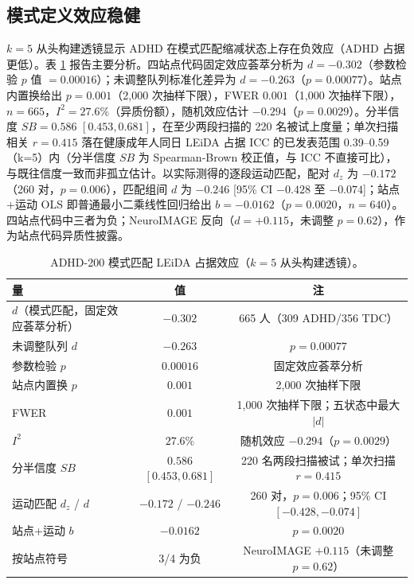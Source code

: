 \documentclass[11pt]{ctexart}
\theoremstyle{definition}
\begin{document}
\subsection{模式定义效应稳健}
$k=5$ 从头构建透镜显示 ADHD 在模式匹配缩减状态上存在负效应（ADHD 占据更低）。表 \ref{tab:o2} 报告主要分析。四站点代码固定效应荟萃分析为 $d=-0.302$（参数检验 $p$ 值 $=0.00016$）；未调整队列标准化差异为 $d=-0.263$（$p=0.00077$）。站点内置换给出 $p=0.001$（2,000 次抽样下限），FWER $0.001$（1,000 次抽样下限），$n=665$，$I^2=27.6\%$（异质份额），随机效应估计 $-0.294$（$p=0.0029$）。分半信度 $SB=0.586$ $[0.453,0.681]$，在至少两段扫描的 220 名被试上度量；单次扫描相关 $r=0.415$ 落在健康成年人同日 LEiDA 占据 ICC 的已发表范围 0.39--0.59（k=5）内\cite{Vohryzek2020}（分半信度 $SB$ 为 Spearman-Brown 校正值，与 ICC 不直接可比），与既往信度一致而非孤立估计。以实际测得的逐段运动匹配，配对 $d_z$ 为 $-0.172$（260 对，$p=0.006$），匹配组间 $d$ 为 $-0.246$ [95\% CI $-0.428$ 至 $-0.074$]；站点+运动 OLS 即普通最小二乘线性回归给出 $b=-0.0162$（$p=0.0020$，$n=640$）。四站点代码中三者为负；NeuroIMAGE 反向（$d=+0.115$，未调整 $p=0.62$），作为站点代码异质性披露。

\begin{table}[H]
\centering
\caption{ADHD-200 模式匹配 LEiDA 占据效应（$k=5$ 从头构建透镜）。}
\begin{tabular}{lcc}
\toprule
量 & 值 & 注 \\
\midrule
$d$（模式匹配，固定效应荟萃分析） & $-0.302$ & 665 人（309 ADHD/356 TDC） \\
未调整队列 $d$ & $-0.263$ & $p=0.00077$ \\
参数检验 $p$ & $0.00016$ & 固定效应荟萃分析 \\
站点内置换 $p$ & $0.001$ & 2,000 次抽样下限 \\
FWER & $0.001$ & 1,000 次抽样下限；五状态中最大 $|d|$ \\
$I^2$ & $27.6\%$ & 随机效应 $-0.294$（$p=0.0029$） \\
分半信度 $SB$ & $0.586$ $[0.453,0.681]$ & 220 名两段扫描被试；单次扫描 $r=0.415$ \\
运动匹配 $d_z$ / $d$ & $-0.172$ / $-0.246$ & 260 对，$p=0.006$；95\% CI $[-0.428,-0.074]$ \\
站点+运动 $b$ & $-0.0162$ & $p=0.0020$ \\
按站点符号 & 3/4 为负 & NeuroIMAGE $+0.115$（未调整 $p=0.62$） \\
\bottomrule
\end{tabular}
\label{tab:o2}
\end{table}
\end{document}
